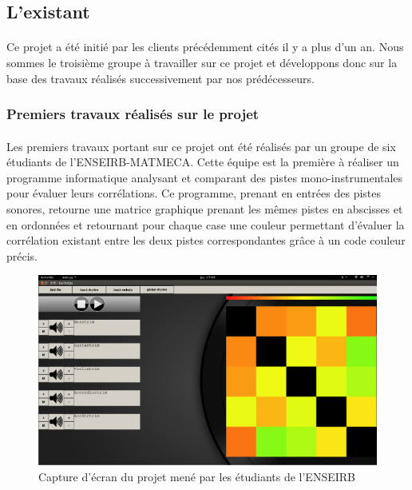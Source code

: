 
\subsection{L'existant}
\paragraph{}
Ce projet a été initié par les clients précédemment cités il y a plus
d'un an. Nous sommes le troisième groupe à travailler sur ce projet et
développons donc sur la base des travaux réalisés successivement par
nos prédécesseurs.

\subsubsection{Premiers travaux réalisés sur le projet}
\paragraph{}
Les premiers travaux portant sur ce projet ont été réalisés par un
groupe de six étudiants de l'ENSEIRB-MATMECA. Cette équipe est la
première à réaliser un programme informatique analysant et comparant
des pistes mono-instrumentales pour évaluer leurs corrélations. Ce
programme, prenant en entrées des pistes sonores, retourne une matrice
graphique prenant les mêmes pistes en abscisses et en ordonnées et
retournant pour chaque case une couleur permettant d'évaluer la
corrélation existant entre les deux pistes correspondantes grâce à un
code couleur précis.

\begin{figure}[H]
 \centering
 \includegraphics[scale=0.5]{assets/matriceenseirb.png}
 \caption{Capture d'écran du projet mené par les étudiants de l'ENSEIRB}
 \label{matrice-enseirb}
\end{figure}

